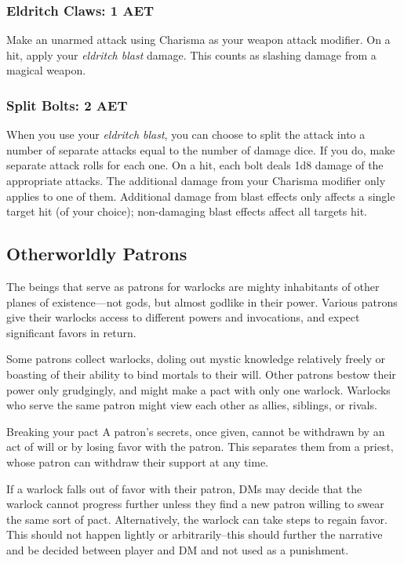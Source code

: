 \subsubsection{Eldritch Claws: 1 AET}
Make an unarmed attack using Charisma as your weapon attack modifier. On a hit, apply your \textit{eldritch blast} damage. This counts as slashing damage from a magical weapon.

\subsubsection{Split Bolts: 2 AET}
When you use your \textit{eldritch blast}, you can choose to split the attack into a number of separate attacks equal to the number of damage dice. If you do, make separate attack rolls for each one. On a hit, each bolt deals 1d8 damage of the appropriate attacks. The additional damage from your Charisma modifier only applies to one of them. Additional damage from blast effects only affects a single target hit (of your choice); non-damaging blast effects affect all targets hit.

\subsection{Otherworldly Patrons}

The beings that serve as patrons for warlocks are mighty inhabitants of other planes of existence—not gods, but almost godlike in their power. Various patrons give their warlocks access to different powers and invocations, and expect significant favors in return.

Some patrons collect warlocks, doling out mystic knowledge relatively freely or boasting of their ability to bind mortals to their will. Other patrons bestow their power only grudgingly, and might make a pact with only one warlock. Warlocks who serve the same patron might view each other as allies, siblings, or rivals.

\begin{DndComment}{Breaking your pact}
	A patron's secrets, once given, cannot be withdrawn by an act of will or by losing favor with the patron. This separates them from a priest, whose patron can withdraw their support at any time.

	If a warlock falls out of favor with their patron, DMs may decide that the warlock cannot progress further unless they find a new patron willing to swear the same sort of pact. Alternatively, the warlock can take steps to regain favor. This should not happen lightly or arbitrarily--this should further the narrative and be decided between player and DM and not used as a punishment.
\end{DndComment}

